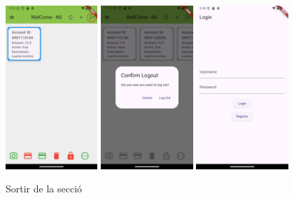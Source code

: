 \documentclass[a4paper,12pt,twoside]{ThesisStyle}
\begin{document}
\begin{figure}[h]
    \centering
    \includegraphics[width=0.31\textwidth]{imatges/mainpageAccount9.png}
    \includegraphics[width=0.31\textwidth]{imatges/logOut.png}
    \includegraphics[width=0.31\textwidth]{imatges/login.png}
    \caption{Sortir de la secció}
    \label{fig: Sortir de la secció}
\end{figure}

\clearpage
\end{document}
